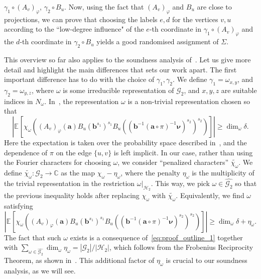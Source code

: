 \documentclass[a4paper,11pt]{article}
\theoremstyle{definition}
\newcommand{\tuple}[1]{{\mathbf{#1}}}
\newcommand{\cc}{\mathbb{C}}
\newcommand{\ex}[1]{\mathbb{E}_{#1}}
\newcommand{\gr}{\mathscr{G}}
\newcommand{\sgr}{\mathscr{H}}
\begin{document}
$\gamma_1 \circ (A_v)_\varphi$, $\gamma_2 \circ B_u$. Now, using the fact that $(A_v)_\varphi$
and $B_u$ are close to projections, we can prove that choosing the labels $e, d$ for the vertices $v,u$ according to the ``low-degree influence" of the $e$-th coordinate in $\gamma_1 \circ (A_v)_\varphi$ and the $d$-th coordinate in $\gamma_2 \circ B_u$ yields a good randomised assignment of $\Sigma$. \par
This overview so far also applies to the soundness analysis of~\cite{EHR04:tcs}. Let us give more detail and highlight the main differences that sets our work apart. The first important difference has to do with the choice of $\gamma_1, \gamma_2$. We define
$\gamma_1= \omega_{x,y}$, and $\gamma_2= \omega_{y,z}$, 
%
where $\omega$ is some irreducible representation of $\gr_2$, and $x,y,z$ are suitable indices in $N_\omega$. In~\cite{EHR04:tcs}, the representation $\omega$ is a non-trivial representation chosen so that
\begin{equation*}
\left|
\ex{}\left[
\chi_\omega\left( (A_v)_{\varphi}(\tuple{a}) B_u(\tuple{b}^{s_1})^{s_1} B_u((\tuple{b}^{-1} (\tuple{a} \circ \pi)^{-1}\bm{\nu})^{s_2})^{s_2} \right)
\right] \right| \geq \dim_\omega \delta.
\end{equation*}
Here the expectation is taken over the probability space described in~, and the dependence of $\pi$ on the edge $\{u,v\}$ is left implicit.
In our case, rather than using the Fourier characters for choosing $\omega$, we consider ``penalized characters'' $\widetilde{\chi_\omega}$. We define $\widetilde{\chi_\omega}: \gr_2 \rightarrow \cc$ as the map 
$\chi_\omega - \eta_\omega$, where
the penalty $\eta_\omega$ is the multiplicity of the trivial representation in the restriction $\omega\vert_{\sgr_2}$. This way, we pick $\omega\in\widehat{\gr_2}$ so that the previous inequality holds after replacing $\chi_\omega$ with $\widetilde{\chi_\omega}$. Equivalently, we find $\omega$ satisfying
\begin{equation}
\label{eq:choice_of_representation3}
\left|
\ex{}\left[
\chi_\omega\left( (A_v)_{\varphi}(\tuple{a}) B_u(\tuple{b}^{s_1})^{s_1} B_u((\tuple{b}^{-1} (\tuple{a} \circ \pi)^{-1}\bm{\nu})^{s_2})^{s_2} \right)
\right] \right| \geq  \dim_\omega \delta+ \eta_\omega .
\end{equation}
The fact that such $\omega$ exists is a consequence of~\eqref{eq:proof_outline_1} together with $\sum_{\omega\in \widehat{\gr_2}} \dim_\omega \eta_\omega = |\gr_2|/|\sgr_2|$, which follows from the Frobenius Reciprocity Theorem, as shown in~. This additional factor of $\eta_\omega$ is crucial to our soundness analysis, as we will see. \par
\end{document}

